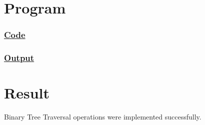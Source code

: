 \section{Program}

\subsubsection{\underline{Code}}



\subsubsection{\underline{Output}}



\vfill

\section{Result}
{\Large\color{white}
Binary Tree Traversal operations were implemented successfully.
\color{black}}

\clearpage